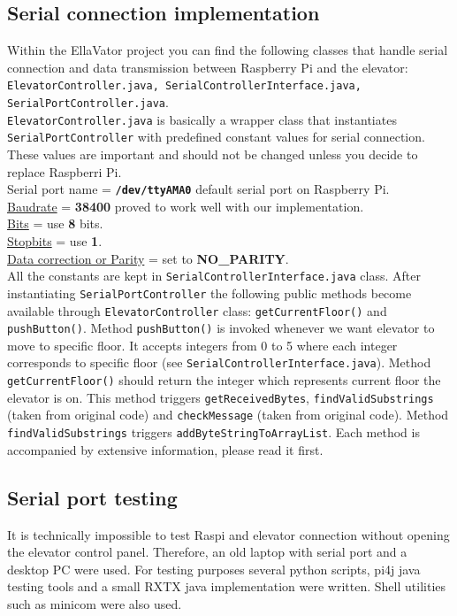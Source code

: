 \documentclass[a4paper, 12pt]{article}
\begin{document}
\subsection{Serial connection implementation}
Within the EllaVator project you can find the following classes that handle serial connection and data transmission between Raspberry Pi and the elevator: \texttt{ElevatorController.java, SerialControllerInterface.java, SerialPortController.java}.\\
\texttt{ElevatorController.java} is basically a wrapper class that instantiates \texttt{SerialPortController} with predefined constant values for serial connection.
These values are important and should not be changed unless you decide to replace Raspberri Pi.\\
Serial port name = \textbf{\texttt{/dev/ttyAMA0}} default serial port on Raspberry Pi.\\
\href{https://en.wikipedia.org/wiki/Serial\_port\#Speed}{Baudrate} = \textbf{38400} proved to work well with our implementation.\\
\href{https://en.wikipedia.org/wiki/Serial\_port\#Data_bits}{Bits} = use \textbf{8} bits.\\
\href{https://en.wikipedia.org/wiki/Serial\_port\#Stop_bits}{Stopbits} = use \textbf{1}.\\
\href{https://en.wikipedia.org/wiki/Serial\_port\#Parity}{Data correction or Parity} = set to \textbf{NO\_PARITY}.\\

All the constants are kept in \texttt{SerialControllerInterface.java} class.
After instantiating \texttt{SerialPortController} the following public methods become available through \texttt{ElevatorController} class: \texttt{getCurrentFloor()} and \texttt{pushButton()}.
Method \texttt{pushButton()} is invoked whenever we want elevator to move to specific floor.
It accepts integers from 0 to 5 where each integer corresponds to specific floor (see \texttt{SerialControllerInterface.java}).
Method \texttt{getCurrentFloor()} should return the integer which represents current floor the elevator is on.
This method triggers \texttt{getReceivedBytes}, \texttt{findValidSubstrings} (taken from original code) and \texttt{checkMessage} (taken from original code).
Method \texttt{findValidSubstrings} triggers \texttt{addByteStringToArrayList}.
Each method is accompanied by extensive information, please read it first.

\subsection{Serial port testing}
It is technically impossible to test Raspi and elevator connection without opening the elevator control panel.
Therefore, an old laptop with serial port and a desktop PC were used.
For testing purposes several python scripts, pi4j java testing tools and a small RXTX java implementation were written.
Shell utilities such as minicom were also used.
\\
\end{document}
